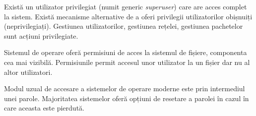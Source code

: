 Există un utilizator privilegiat (numit generic \textit{superuser}) care are acces complet la sistem.
Există mecanisme alternative de a oferi privilegii utilizatorilor obișnuiți (neprivilegiați).
Gestiunea utilizatorilor, gestiunea rețelei, gestiunea pachetelor sunt acțiuni privilegiate.

Sistemul de operare oferă permisiuni de acces la sistemul de fișiere, componenta cea mai vizibilă.
Permisiunile permit accesul unor utilizator la un fișier dar nu al altor utilizatori.

Modul uzual de accesare a sistemelor de operare moderne este prin intermediul unei parole.
Majoritatea sistemelor oferă opțiuni de resetare a parolei în cazul în care aceasta este pierdută.
